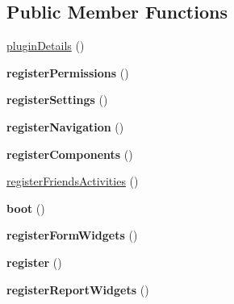 \subsection*{Public Member Functions}
\begin{DoxyCompactItemize}
\item 
\hyperlink{classDMA_1_1Friends_1_1Plugin_abcae4983c18bdb7b266c6aaa7a081d68}{plugin\+Details} ()
\item 
\hypertarget{classDMA_1_1Friends_1_1Plugin_a1f5f007ec6f0f3f16516cf1a2e19d296}{{\bfseries register\+Permissions} ()}\label{classDMA_1_1Friends_1_1Plugin_a1f5f007ec6f0f3f16516cf1a2e19d296}

\item 
\hypertarget{classDMA_1_1Friends_1_1Plugin_ad494274bdd3480e4623b5fec196352b3}{{\bfseries register\+Settings} ()}\label{classDMA_1_1Friends_1_1Plugin_ad494274bdd3480e4623b5fec196352b3}

\item 
\hypertarget{classDMA_1_1Friends_1_1Plugin_aaca6d71040b99d2151b2760c93f3e61c}{{\bfseries register\+Navigation} ()}\label{classDMA_1_1Friends_1_1Plugin_aaca6d71040b99d2151b2760c93f3e61c}

\item 
\hypertarget{classDMA_1_1Friends_1_1Plugin_aba0ea6e404e36aaba19174560d3781ac}{{\bfseries register\+Components} ()}\label{classDMA_1_1Friends_1_1Plugin_aba0ea6e404e36aaba19174560d3781ac}

\item 
\hyperlink{classDMA_1_1Friends_1_1Plugin_aee1fcfd6978df90e396e75223e24080a}{register\+Friends\+Activities} ()
\item 
\hypertarget{classDMA_1_1Friends_1_1Plugin_a8ff526c557ed7081a1f4c04194994305}{{\bfseries boot} ()}\label{classDMA_1_1Friends_1_1Plugin_a8ff526c557ed7081a1f4c04194994305}

\item 
\hypertarget{classDMA_1_1Friends_1_1Plugin_a900bf22951ffe9e109d1c14afdd261d5}{{\bfseries register\+Form\+Widgets} ()}\label{classDMA_1_1Friends_1_1Plugin_a900bf22951ffe9e109d1c14afdd261d5}

\item 
\hypertarget{classDMA_1_1Friends_1_1Plugin_adfd39323d7e2724cdacdb41d590b32e2}{{\bfseries register} ()}\label{classDMA_1_1Friends_1_1Plugin_adfd39323d7e2724cdacdb41d590b32e2}

\item 
\hypertarget{classDMA_1_1Friends_1_1Plugin_af4c0877dc0c5067f527fa414bc70de57}{{\bfseries register\+Report\+Widgets} ()}\label{classDMA_1_1Friends_1_1Plugin_af4c0877dc0c5067f527fa414bc70de57}


\end{DoxyCompactItemize}
